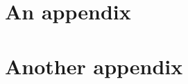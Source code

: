 \documentclass[english, 11pt]{article}\usepackage[]{graphicx}\usepackage[]{color}
\providecommand{\DIFaddbegin}{} %
\providecommand{\DIFaddend}{} %
\begin{document}
\DIFaddend %


\DIFaddbegin 

\appendix
\section{An appendix}

\lipsum[10-11]


















\section{Another appendix}

\lipsum[12-13]

\DIFaddend 

















\end{document}
